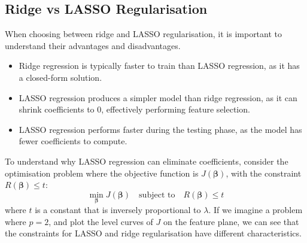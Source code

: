 \documentclass{article}
\begin{document}
\subsection{Ridge vs LASSO Regularisation}
When choosing between ridge and LASSO regularisation, it is important to
understand their advantages and disadvantages.
\begin{itemize}
    \item Ridge regression is typically faster to train than LASSO
          regression, as it has a closed-form solution.
    \item LASSO regression produces a simpler model than ridge
          regression, as it can shrink coefficients to 0, effectively
          performing feature selection.
    \item LASSO regression performs faster during the testing phase, as
        the model has fewer coefficients to compute.
\end{itemize}
To understand why LASSO regression can eliminate coefficients, consider
the optimisation problem where the objective function is
\(J\left( \symbf{\beta} \right)\), with the constraint
\(R\left( \symbf{\beta} \right) \leqslant t\):
\begin{equation*}
    \min_{\symbf{\beta}} J\left( \symbf{\beta} \right) \quad \text{subject to} \quad R\left( \symbf{\beta} \right) \leqslant t
\end{equation*}
where \(t\) is a constant that is inversely proportional to \(\lambda\).
If we imagine a problem where \(p = 2\), and plot the level curves of
\(J\) on the feature plane, we can see that the constraints for
LASSO and ridge regularisation have different characteristics.
\end{document}
